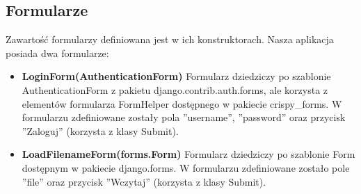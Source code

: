 \subsection{Formularze}
Zawartość formularzy definiowana jest w ich konstruktorach. Nasza aplikacja posiada dwa formularze: 
\begin{itemize}
	\item \textbf{LoginForm(AuthenticationForm)}\newline
	Formularz dziedziczy po szablonie AuthenticationForm z pakietu django.contrib.auth.forms, ale korzysta z elementów formularza FormHelper dostępnego w pakiecie crispy\_forms. W formularzu zdefiniowane zostały pola ''username'', ''password'' oraz przycisk ''Zaloguj'' (korzysta z klasy Submit).
	\item \textbf{LoadFilenameForm(forms.Form)}\newline
	Formularz dziedziczy po szablonie Form dostępnym w pakiecie django.forms. W formularzu zdefiniowane zostało pole ''file'' oraz przycisk ''Wczytaj'' (korzysta z klasy Submit). 
\end{itemize}

